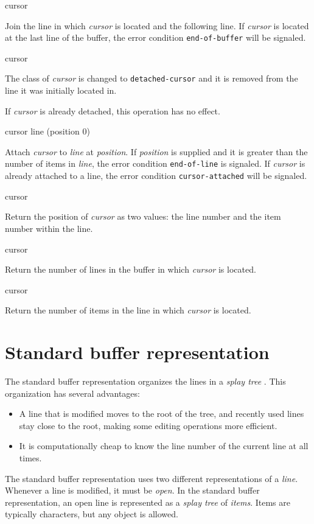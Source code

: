  {cursor}

Join the line in which \textit{cursor} is located and the following
line.  If \textit{cursor} is located at the last line of the buffer,
the error condition \texttt{end-of-buffer} will be signaled.

 {cursor}

The class of \textit{cursor} is changed to \texttt{detached-cursor}
and it is removed from the line it was initially located in. 

If \textit{cursor} is already detached, this operation has no effect.

 {cursor line \optional (position 0)}

Attach \textit{cursor} to \textit{line} at \textit{position}.  If
\textit{position} is supplied and it is greater than the number of
items in \textit{line}, the error condition \texttt{end-of-line} is
signaled.  If \textit{cursor} is already attached to a line, the error
condition \texttt{cursor-attached} will be signaled.

 {cursor}

Return the position of \textit{cursor} as two values: the line number
and the item number within the line. 

 {cursor}

Return the number of lines in the buffer in which \textit{cursor} is
located.

 {cursor}

Return the number of items in the line in which \textit{cursor} is
located.

\section{Standard buffer representation}

The standard buffer representation organizes the lines in a
\emph{splay tree} \cite{Sleator:1985:SBS:3828.3835}.  This
organization has several advantages:

\begin{itemize}
\item A line that is modified moves to the root of the tree, and
  recently used lines stay close to the root, making some editing
  operations more efficient.
\item It is computationally cheap to know the line number of the
  current line at all times. 
\end{itemize}

The standard buffer representation uses two different representations
of a \emph{line}.  Whenever a line is modified, it must be
\emph{open}.  In the standard buffer representation, an open line is
represented as a \emph{splay tree} \cite{Sleator:1985:SBS:3828.3835}
of \emph{items}.  Items are typically characters, but any object is
allowed.


